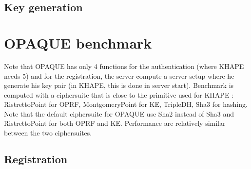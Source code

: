 \documentclass[../report.tex]{subfiles}
\begin{document}
\subsection{Key generation}

\pgfplotsset{width=\textwidth-0.3cm}
\pgfplotsset{height=4cm}







\section{OPAQUE benchmark} %

Note that OPAQUE has only 4 functions for the authentication (where KHAPE needs 5) and for the registration, the server compute a server setup where he generate his key pair (in KHAPE, this is done in server start).
Benchmark is computed with a ciphersuite that is close to the primitive used for KHAPE : RistrettoPoint for OPRF, MontgomeryPoint for KE, TripleDH, Sha3 for hashing.
Note that the default ciphersuite for OPAQUE use Sha2 instead of Sha3 and RistrettoPoint for both OPRF and KE. Performance are relatively similar between the two ciphersuites.

\pgfplotsset{width=\textwidth-1.1cm}


\subsection*{Registration}
\end{document}
